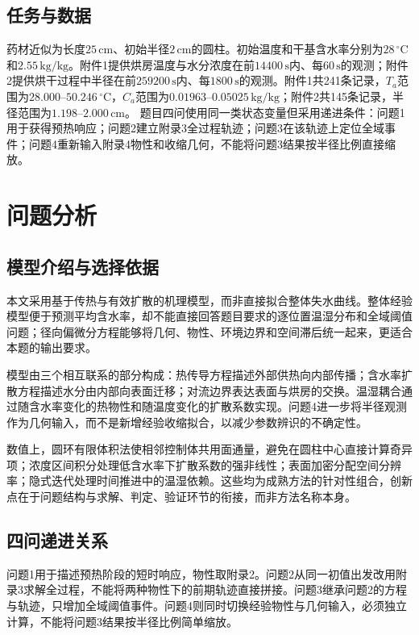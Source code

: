 \documentclass[UTF8,zihao=-4,a4paper]{ctexart}
\begin{document}
\subsection{任务与数据}
药材近似为长度$25\,\mathrm{cm}$、初始半径$2\,\mathrm{cm}$的圆柱。初始温度和干基含水率分别为$28\,^{\circ}\mathrm C$和$2.55\,\mathrm{kg/kg}$。附件1提供烘房温度与水分浓度在前$14400\,\mathrm s$内、每$60\,\mathrm s$的观测；附件2提供烘干过程中半径在前$259200\,\mathrm s$内、每$1800\,\mathrm s$的观测。附件1共241条记录，$T_a$范围为$28.000$--$50.246\,^{\circ}\mathrm C$，$C_a$范围为$0.01963$--$0.05025\,\mathrm{kg/kg}$；附件2共145条记录，半径范围为$1.198$--$2.000\,\mathrm{cm}$。
题目四问使用同一类状态变量但采用递进条件：问题1用于获得预热响应；问题2建立附录3全过程轨迹；问题3在该轨迹上定位全域事件；问题4重新输入附录4物性和收缩几何，不能将问题3结果按半径比例直接缩放。

\section{问题分析}
\subsection{模型介绍与选择依据}
本文采用基于传热与有效扩散的机理模型，而非直接拟合整体失水曲线。整体经验模型便于预测平均含水率，却不能直接回答题目要求的逐位置温湿分布和全域阈值问题；径向偏微分方程能够将几何、物性、环境边界和空间滞后统一起来，更适合本题的输出要求。

模型由三个相互联系的部分构成：热传导方程描述外部供热向内部传播；含水率扩散方程描述水分由内部向表面迁移；对流边界表达表面与烘房的交换。温湿耦合通过随含水率变化的热物性和随温度变化的扩散系数实现。问题4进一步将半径观测作为几何输入，而不是新增经验收缩拟合，以减少参数辨识的不确定性。

数值上，圆环有限体积法使相邻控制体共用面通量，避免在圆柱中心直接计算奇异项；浓度区间积分处理低含水率下扩散系数的强非线性；表面加密分配空间分辨率；隐式迭代处理时间推进中的温湿依赖。这些均为成熟方法的针对性组合，创新点在于问题结构与求解、判定、验证环节的衔接，而非方法名称本身。
\subsection{四问递进关系}
问题1用于描述预热阶段的短时响应，物性取附录2。问题2从同一初值出发改用附录3求解全过程，不能将两种物性下的前期轨迹直接拼接。问题3继承问题2的方程与轨迹，只增加全域阈值事件。问题4则同时切换经验物性与几何输入，必须独立计算，不能将问题3结果按半径比例简单缩放。
\end{document}
